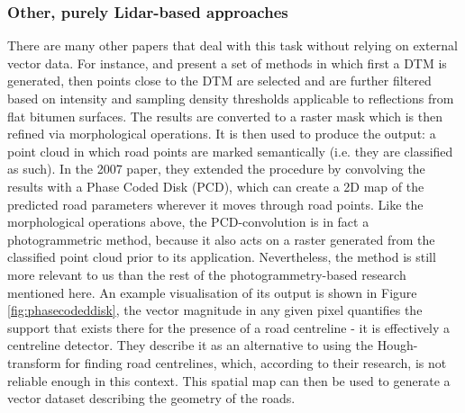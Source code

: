 \subsubsection{Other, purely Lidar-based approaches}

There are many other papers that deal with this task without relying on external vector data. For instance, \cite{clode_etal_2004} and \cite{clode_etal_2007} present a set of methods in which first a DTM is generated, then points close to the DTM are selected and are further filtered based on intensity and sampling density thresholds applicable to reflections from flat bitumen surfaces. The results are converted to a raster mask which is then refined via morphological operations. It is then used to produce the output: a point cloud in which road points are marked semantically (i.e. they are classified as such). In the 2007 paper, they extended the procedure by convolving the results with a Phase Coded Disk (PCD), which can create a 2D map of the predicted road parameters wherever it moves through road points. Like the morphological operations above, the PCD-convolution is in fact a photogrammetric method, because it also acts on a raster generated from the classified point cloud prior to its application. Nevertheless, the method is still more relevant to us than the rest of the photogrammetry-based research mentioned here. An example visualisation of its output is shown in Figure \ref{fig:phasecodeddisk}, the vector magnitude in any given pixel quantifies the support that exists there for the presence of a road centreline - it is effectively a centreline detector. They describe it as an alternative to using the Hough-transform for finding road centrelines, which, according to their research, is not reliable enough in this context. This spatial map can then be used to generate a vector dataset describing the geometry of the roads.

